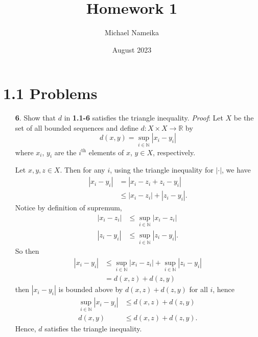\documentclass{article}
\title{Homework 1}
\author{Michael Nameika}
\date{August 2023}
\begin{document}
\maketitle

\section*{1.1 Problems}
\begin{itemize}
    \item[\textbf{6}.] Show that $d$ in \textbf{1.1-6} satisfies the triangle inequality.
    \newline\newline
    \textit{Proof}: Let $X$ be the set of all bounded sequences and define $d: X \times X \to \mathbb{R}$ by
    \[d(x,y) = \sup_{i \in \mathbb{N}}|x_i - y_i|\]
    where $x_i$, $y_i$ are the $i^{\text{th}}$ elements of $x$, $y \in X$, respectively. 
    \newline

    Let $x,y,z \in X$. Then for any $i$, using the triangle inequality for $|\cdot|$, we have
    \begin{align*}
        |x_i - y_i| &= |x_i - z_i + z_i - y_i|\\
        &\leq |x_i - z_i| + |z_i - y_i|.
    \end{align*}
    Notice by definition of supremum,
    \begin{align*}
        |x_i - z_i| &\leq \sup_{i\in \mathbb{N}} |x_i - z_i|\\
        |z_i - y_i| &\leq \sup_{i\in \mathbb{N}} |z_i - y_i|.
    \end{align*}
    So then
    \begin{align*}
        |x_i - y_i| &\leq \sup_{i\in \mathbb{N}} |x_i - z_i| + \sup_{i\in \mathbb{N}} |z_i - y_i|\\
        &= d(x,z) + d(z,y)
    \end{align*}
    then $|x_i - y_i|$ is bounded above by $d(x,z) + d(z,y)$ for all $i$, hence
    \begin{align*}
        \sup_{i\in \mathbb{N}}|x_i - y_i| &\leq d(x,z) + d(z,y)\\
        d(x,y) &\leq d(x,z) + d(z,y).
    \end{align*}
    Hence, $d$ satisfies the triangle inequality.


\end{itemize}
\end{document}
